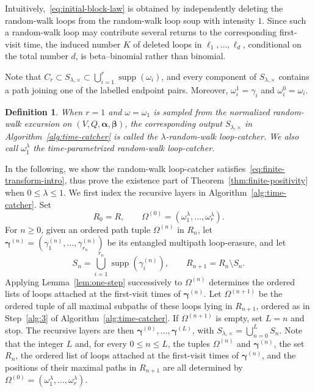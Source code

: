 \documentclass[11pt]{article}
\numberwithin{equation}{section}
\newcommand{\1}{\mathbf{1}}
\newtheorem{definition}[theorem]{Definition}
\newcommand{\supp}{\operatorname{supp}}
\newcommand{\balpha}{\boldsymbol{\alpha}}
\newcommand{\bbeta}{\boldsymbol{\beta}}
\begin{document}
 Intuitively,~\eqref{eq:initial-block-law} is obtained by independently deleting the random-walk loops from the random-walk loop soup with intensity $1$. Since such a random-walk loop may contribute several returns to the corresponding first-visit time, the induced number $K$ of deleted loops in $\ell_1,\ldots,\ell_d$, conditional on the total number $d$, is beta--binomial rather than binomial. 

Note that $C_r\subset S_{\lambda,\times}
 \subset\bigcup_{i=1}^r\supp(\omega_i)$, and every component of $S_{\lambda,\times}$ contains a path joining one of the
labelled endpoint pairs. Moreover, $\omega_i^1=\gamma_i$ and $\omega_i^0=\omega_i$.



\begin{definition}\label{def:catcher}
When $r=1$ and $\omega=\omega_1$ is sampled from the normalized random-walk excursion on $(V,Q,\balpha,\bbeta)$, the corresponding output $S_{\lambda,\times}$ in Algorithm~\ref{alg:time-catcher} is called the $\lambda$-random-walk loop-catcher. We also call $\omega_1^\lambda$ the time-parametrized random-walk loop-catcher.
\end{definition}
In the following, we show the random-walk loop-catcher satisfies~\eqref{eq:finite-transform-intro}, thus prove the existence part of Theorem~\ref{thm:finite-positivity} when $0\le\lambda\le 1$.
We first index the recursive layers in Algorithm~\ref{alg:time-catcher}.  Set
\[
 R_0=R,\qquad
 \Omega^{(0)}
 =(\omega_1^\lambda,\ldots,\omega_r^\lambda).
\]
For $n\ge0$, given an ordered path tuple $\Omega^{(n)}$ in $R_n$, let $\boldsymbol\gamma^{(n)}
 =(\gamma_1^{(n)},\ldots,\gamma_{r_n}^{(n)})$ be its entangled multipath loop-erasure, and let
\[
 S_n=\bigcup_{i=1}^{r_n}\supp(\gamma_i^{(n)}),
 \qquad
 R_{n+1}=R_n\setminus S_n.
\]
Applying Lemma~\ref{lem:one-step} successively to $\Omega^{(n)}$ determines the ordered lists of loops attached at the first-visit times of $\boldsymbol\gamma^{(n)}$.
Let
$\Omega^{(n+1)}$ be the ordered tuple of all maximal subpaths
of these loops lying in \(R_{n+1}\), ordered as in
Step~\ref{alg:3} of Algorithm~\ref{alg:time-catcher}. 
If $\Omega^{(n+1)}$ is
empty, set $L=n$ and stop. The recursive
layers are then $\boldsymbol\gamma^{(0)},\ldots,\boldsymbol\gamma^{(L)}$, with $S_{\lambda,\times}=\bigcup_{n=0}^L S_n$.
Note that the integer $L$ and, for every $0\le n\le L$, the tuples
$\Omega^{(n)}$ and $\boldsymbol\gamma^{(n)}$, the set $R_n$,
the ordered list of loops attached at the first-visit times of
$\boldsymbol\gamma^{(n)}$, and the positions of their maximal paths in
$R_{n+1}$ are all determined by 
$\Omega^{(0)}=(\omega_1^\lambda,\ldots,\omega_r^\lambda)$.
\end{document}
